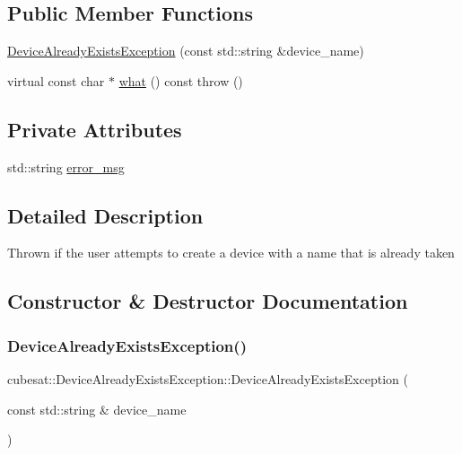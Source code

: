 \subsection*{Public Member Functions}
\begin{DoxyCompactItemize}
\item 
\hyperlink{classcubesat_1_1DeviceAlreadyExistsException_a98774fd7ef2f0c8ae21834aa31509261}{Device\+Already\+Exists\+Exception} (const std\+::string \&device\+\_\+name)
\item 
virtual const char $\ast$ \hyperlink{classcubesat_1_1DeviceAlreadyExistsException_a414ac8b05f5219189998541c0e8c15c0}{what} () const  throw ()
\end{DoxyCompactItemize}
\subsection*{Private Attributes}
\begin{DoxyCompactItemize}
\item 
std\+::string \hyperlink{classcubesat_1_1DeviceAlreadyExistsException_a23f9b3de4f6d97af9997336d61f06f31}{error\+\_\+msg}
\end{DoxyCompactItemize}


\subsection{Detailed Description}
Thrown if the user attempts to create a device with a name that is already taken 

\subsection{Constructor \& Destructor Documentation}
\mbox{\label{classcubesat_1_1DeviceAlreadyExistsException_a98774fd7ef2f0c8ae21834aa31509261}} 
\subsubsection{\texorpdfstring{Device\+Already\+Exists\+Exception()}{DeviceAlreadyExistsException()}}
{\footnotesize\ttfamily cubesat\+::\+Device\+Already\+Exists\+Exception\+::\+Device\+Already\+Exists\+Exception (\begin{DoxyParamCaption}\item[{const std\+::string \&}]{device\+\_\+name }\end{DoxyParamCaption})\hspace{0.3cm}{\ttfamily [inline]}}



